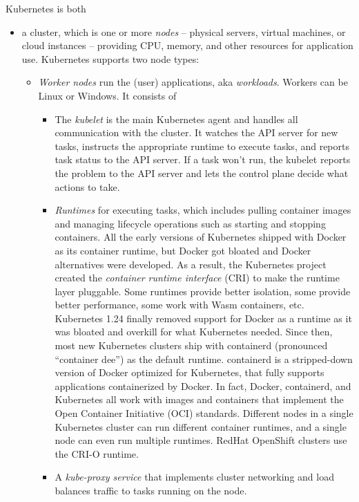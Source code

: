 \documentclass[table, xcdraw]{article}%
\begin{document}
Kubernetes is both

\begin{itemize}
	\item a cluster, which is one or more \emph{nodes} -- physical servers, virtual machines, or cloud instances -- providing CPU, memory, and other resources for application use. Kubernetes supports two node types:

	\begin{itemize}
		\item \emph{Worker nodes} run the (user) applications, aka \emph{workloads}. Workers can be Linux or Windows. It consists of
		
		\begin{itemize}
			\item The \emph{kubelet} is the main Kubernetes agent and handles all communication with the cluster. It watches the API server for new tasks, instructs the appropriate runtime to execute tasks, and reports task status to the API server. If a task won’t run, the kubelet reports the problem to the API server and lets the control plane decide what actions to take.
			\item \emph{Runtimes} for executing tasks, which includes pulling container images and managing lifecycle operations such as starting and stopping containers. All the early versions of Kubernetes shipped with Docker as its container runtime, but Docker got bloated and Docker alternatives were developed. As a result, the Kubernetes project created the \emph{container runtime interface} (CRI) to make the runtime layer pluggable. Some runtimes provide better isolation, some provide better performance, some work with Wasm containers, etc. Kubernetes 1.24 finally removed support for Docker as a runtime as it was bloated and overkill for what Kubernetes needed. Since then, most new Kubernetes clusters ship with containerd (pronounced “container dee”) as the default runtime. containerd is a stripped-down version of Docker optimized for Kubernetes, that fully supports applications containerized by Docker. In fact, Docker, containerd, and Kubernetes all work with images and containers that implement the Open Container Initiative (OCI) standards. Different nodes in a single Kubernetes cluster can run different container runtimes, and a single node can even run multiple runtimes. RedHat OpenShift clusters use the CRI-O runtime.
			\item A \emph{kube-proxy service} that implements cluster networking and load balances traffic to tasks running on the node.
		\end{itemize}
		

\end{itemize}
\end{itemize}
\end{document}
